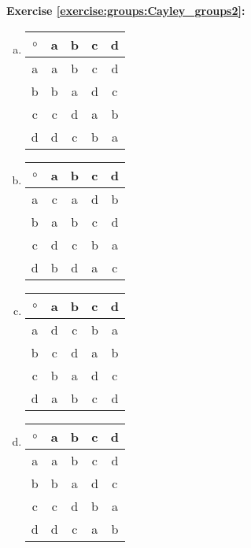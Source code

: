 \textbf{Exercise \ref{exercise:groups:Cayley_groups2}:}
\begin{enumerate}[(a)]
\item

\begin{center}
	\begin{tabular}{c| c c c c }
		$\circ$ & a & b & c & d\\
		\hline
		a & a & b & c & d\\
		b & b & a & d & c\\
		c & c & d & a & b\\
		d & d & c & b & a
	\end{tabular}
\end{center}
\item

\begin{center}
	\begin{tabular}{c| c c c c }
		$\circ$ & a & b & c & d\\
		\hline
		a & c & a & d & b\\
		b & a & b & c & d\\
		c & d & c & b & a\\
		d & b & d & a & c
	\end{tabular}
\end{center}
\item

\begin{center}
	\begin{tabular}{c| c c c c }
		$\circ$ & a & b & c & d\\
		\hline
		a & d & c & b & a\\
		b & c & d & a & b\\
		c & b & a & d & c\\
		d & a & b & c & d
	\end{tabular}
\end{center}
\item
 
\begin{center}
	\begin{tabular}{c| c c c c }
		$\circ$ & a & b & c & d\\
		\hline
		a & a & b & c & d\\
		b & b & a & d & c\\
		c & c & d & b & a\\
		d & d & c & a & b
	\end{tabular}
\end{center}
\end{enumerate}
